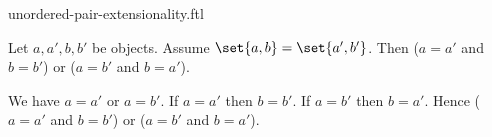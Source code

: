 \documentclass{article}
\begin{document}
\begin{smodule}{unordered-pair-extensionality.ftl}

  \begin{fproposition*}[label=6125259604361216]
    Let $a, a', b, b'$ be objects.
    Assume $\set{a,b} = \set{a',b'}$.
    Then ($a = a'$ and $b = b'$) or ($a = b'$ and $b = a'$).
  \end{fproposition*}
  \begin{fproof*}
    We have $a = a'$ or $a = b'$.
    If $a = a'$ then $b = b'$.
    If $a = b'$ then $b = a'$.
    Hence ($a = a'$ and $b = b'$) or ($a = b'$ and $b = a'$).
  \end{fproof*}
\end{smodule}
\end{document}
